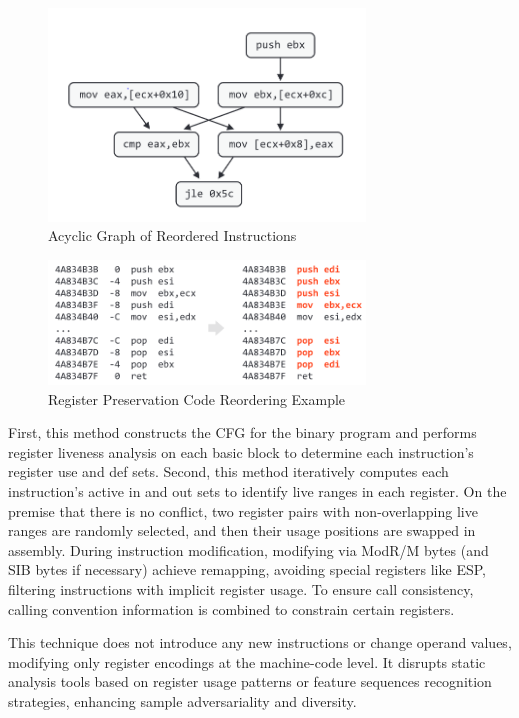 \begin{enumerate}
\begin{figure}[hbt]
	\centering
	\includegraphics[width=0.75\textwidth]{figures/4.4}
	\caption{Acyclic Graph of Reordered Instructions}\label{fig:4.4}
\end{figure}

\begin{figure}[hbt]
	\centering
	\includegraphics[width=0.75\textwidth]{figures/4.5}
	\caption{Register Preservation Code Reordering Example}\label{fig:4.5}
\end{figure}

First, this method constructs the CFG for the binary program and performs register liveness analysis on each basic block to determine each instruction's register use and def sets. Second, this method iteratively computes each instruction's active in and out sets to identify live ranges in each register. On the premise that there is no conflict, two register pairs with non-overlapping live ranges are randomly selected, and then their usage positions are swapped in assembly. During instruction modification, modifying via ModR/M bytes (and SIB bytes if necessary) achieve remapping, avoiding special registers like ESP, filtering instructions with implicit register usage. To ensure call consistency, calling convention information is combined to constrain certain registers.

This technique does not introduce any new instructions or change operand values, modifying only register encodings at the machine-code level. It disrupts static analysis tools based on register usage patterns or feature sequences recognition strategies, enhancing sample adversariality and diversity.
\end{enumerate}




